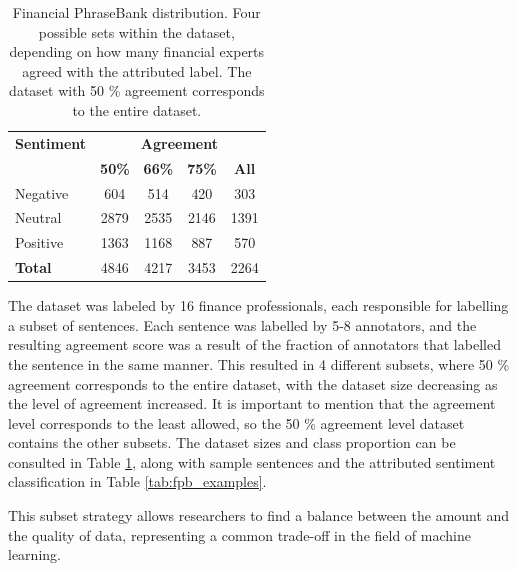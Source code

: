 \documentclass[conference]{IEEEtran}
\begin{document}
\begin{table}[H]
\centering
\caption{Financial PhraseBank distribution. Four possible sets within the dataset, depending on how many financial experts agreed with the attributed label. The dataset with 50 \% agreement corresponds to the entire dataset.}

\label{agreement_datasets}
\begin{tabular}{lcccc}
\toprule
\textbf{Sentiment} & \multicolumn{4}{c}{\textbf{Agreement}} \\
\cmidrule(lr){2-5}
 & \textbf{50\%} & \textbf{66\%} & \textbf{75\%} & \textbf{All} \\
\midrule
Negative & 604 & 514 & 420 & 303 \\
Neutral & 2879 & 2535 & 2146 & 1391 \\
Positive & 1363 & 1168 & 887 & 570 \\
\midrule
\textbf{Total} & 4846 & 4217 & 3453 & 2264 \\
\bottomrule
\end{tabular}
\end{table}

The dataset was labeled by 16 finance professionals, each responsible for labelling a subset of sentences. Each sentence was labelled by 5-8 annotators, and the resulting agreement score was a result of the fraction of annotators that labelled the sentence in the same manner. This resulted in 4 different subsets, where 50 \% agreement corresponds to the entire dataset, with the dataset size decreasing as the level of agreement increased. It is important to mention that the agreement level corresponds to the least allowed, so the 50 \% agreement level dataset contains the other subsets. The dataset sizes and class proportion can be consulted in Table \ref{agreement_datasets}, along with sample sentences and the attributed sentiment classification in Table \ref{tab:fpb_examples}.

This subset strategy allows researchers to find a balance between the amount and the quality of data, representing a common trade-off in the field of machine learning.

\end{document}
